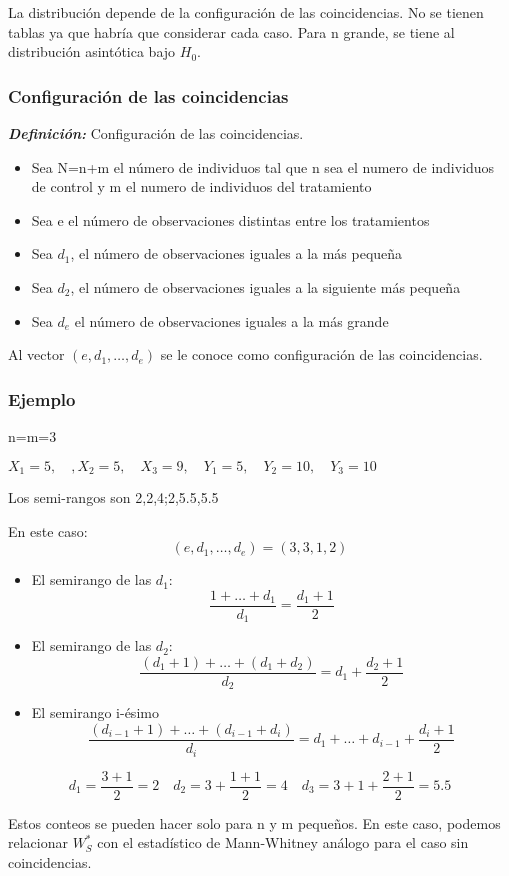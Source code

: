 La distribución depende de la configuración de las coincidencias. No se tienen tablas ya que habría que considerar cada caso.
Para n grande, se tiene al distribución asintótica bajo $H_0$.
\subsubsection{Configuración de las coincidencias}
\textit{\textbf{Definición: }}Configuración de las coincidencias. 
\begin{itemize}
    \item Sea N=n+m el número de individuos tal que n sea el numero de individuos de control y m el numero de individuos del tratamiento
    \item Sea e el número de observaciones distintas entre los tratamientos
    \item Sea $d_1$, el número de observaciones iguales a la más pequeña
    \item Sea $d_2$, el número de observaciones iguales a la siguiente más pequeña
    \item Sea $d_e$ el número de observaciones iguales a la más grande
\end{itemize}

Al vector $(e,d_1,\dots,d_e)$ se le conoce como configuración de las coincidencias.

\subsubsection*{Ejemplo}
n=m=3

\(
X_1=5, \quad, X_2=5, \quad X_3=9, \quad Y_1=5,\quad Y_2=10,\quad Y_3=10
\)

Los semi-rangos son 2,2,4;2,5.5,5.5

En este caso:
\[
(e,d_1,\dots,d_e)=(3,3,1,2)
\]
\begin{itemize}
    \item El semirango de las $d_1$:
    \[
    \frac{1+\dots+d_1}{d_1}=\frac{d_1+1}{2}
    \]
    \item El semirango de las $d_2$:
    \[
    \frac{(d_1+1)+\dots+(d_1+d_2)}{d_2}=d_1+\frac{d_2+1}{2}
    \]
    \item El semirango i-ésimo
    \[
    \frac{(d_{i-1}+1)+\dots+(d_{i-1}+d_i)}{d_i}=d_1+\dots+d_{i-1}+\frac{d_i+1}{2}
    \]
\end{itemize}

\[
d_1=\frac{3+1}{2}=2 \quad d_2=3+\frac{1+1}{2}=4 \quad d_3=3+1+\frac{2+1}{2}=5.5
\]

Estos conteos se pueden hacer solo para n y m pequeños. En este caso, podemos relacionar $W_S^*$ con el estadístico de Mann-Whitney análogo para el caso sin coincidencias.

